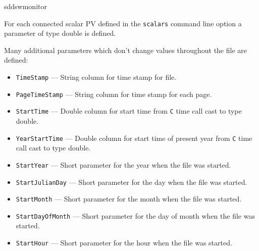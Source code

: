 \begin{sddsprog}{sddswmonitor}
\begin{itemize}
For each connected scalar PV defined in the \verb+scalars+ command line option a parameter of type double is defined.

Many additional parameters which don't change values throughout the file are defined:
\begin{itemize}
        \item {\tt TimeStamp} --- String column for time stamp for file.
        \item {\tt PageTimeStamp} --- String column for time stamp for each page.
        \item {\tt StartTime} --- Double column for start time from {\tt C} time call cast to type double.
        \item {\tt YearStartTime} --- Double column for start time of present year from {\tt C}
                time call cast to type double.
        \item {\verb+StartYear+} --- Short parameter for the year when the file was started.
        \item {\verb+StartJulianDay+} --- Short parameter for the day when the file was started.
        \item {\verb+StartMonth+} --- Short parameter for the month when the file was started.
        \item {\verb+StartDayOfMonth+} --- Short parameter for the day of month when the file was started.
        \item {\verb+StartHour+} --- Short parameter for the hour when the file was started.
\end{itemize}
\end{itemize}


\end{sddsprog}
